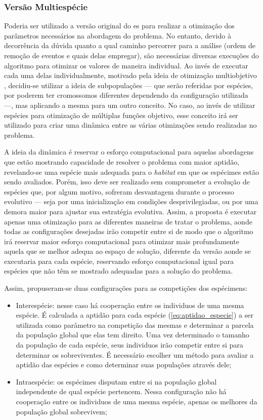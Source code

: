 \subsubsection{Versão Multiespécie}
\label{sssec:multiespecie}

Poderia ser utilizado a versão original do \acs{es} para realizar a
otimização dos parâmetros necessários na abordagem do problema. No
entanto, devido à decorrência da dúvida quanto a qual caminho
percorrer para a análise (ordem de remoção de eventos e quais delas
empregar), são necessárias diversas execuções
do algoritmo para otimizar os valores de maneira individual. Ao invés
de executar cada uma delas individualmente, motivado pela ideia de otimização
multiobjetivo \cite[cap. 9]{eiben2003introduction}, decidiu-se utilizar
a ideia de subpopulações --- que serão referidas por espécies, por
poderem ter cromossomos diferentes dependendo da configuração
utilizada ---, mas aplicando a mesma para um outro conceito. No caso,
ao invés de utilizar espécies para otimização de múltiplas funções
objetivo, esse conceito irá ser utilizado para criar uma dinâmica
entre as várias otimizações sendo realizadas no problema.

A ideia da dinâmica é reservar o esforço computacional para aquelas
abordagens que estão mostrando capacidade de resolver o problema com
maior aptidão, revelando-se uma espécie mais adequada para o
\emph{habitat} em que os espécimes estão sendo avaliados. Porém, isso
deve ser realizado sem comprometer a evolução de espécies que, por
algum motivo, sofreram desvantagem durante o processo evolutivo ---
seja por uma inicialização em condições desprivilegiadas, ou por uma
demora maior para ajustar sua estratégia evolutiva. Assim, a proposta
é executar apenas uma otimização para as diferentes maneiras de
tratar o problema, aonde todas as configurações desejadas irão
competir entre si de modo que o algoritmo irá reservar maior
esforço computacional para otimizar mais profundamente aquela que se
melhor adequa ao espaço de solução, diferente da versão aonde se
executaria para cada espécie, reservando esforço computacional igual
para espécies que não têm se mostrado adequadas para a solução do
problema.

Assim, propuseram-se duas configurações para as competições dos
espécimens:

\begin{itemize}
\item Interespécie: nesse caso há cooperação entre os individuos de
uma mesma espécie. É calculada a aptidão para cada espécie
(\ref{eq:aptidao_especie}) a ser utilizada como parâmetro na
competição das mesmas e determinar a parcela da população global que
elas tem direito. Uma vez determinado o tamanho da população de cada
espécie, seus individuos irão competir entre si para determinar os
sobreviventes. É necessário escolher um método para avaliar a aptidão
das espécies e como determinar suas populações através dele;
\item Intraespécie: os espécimes disputam entre si na população global
independente de qual espécie pertencem. Nessa configuração não há
cooperação entre os individuos de uma mesma espécie, apenas os
melhores da população global sobrevivem;
\end{itemize}

